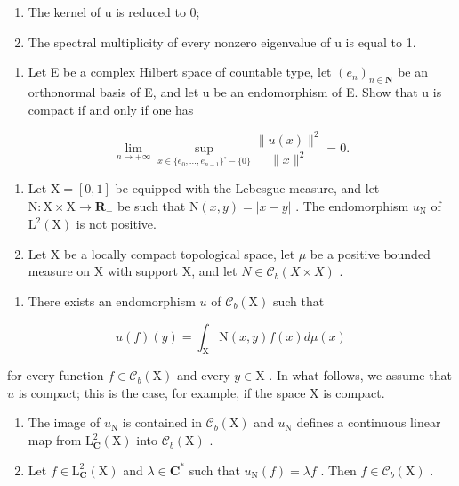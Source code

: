 \begin{enumerate}
\def\labelenumi{(\roman{enumi})}
\item
  The kernel of u is reduced to 0;
\item
  The spectral multiplicity of every nonzero eigenvalue of u is equal to 1.
\end{enumerate}

\begin{enumerate}
\def\labelenumi{\arabic{enumi})}
\setcounter{enumi}{12}
\tightlist
\item
  Let E be a complex Hilbert space of countable type, let \((e_{n})_{n\in\mathbf{N}}\) be an orthonormal basis of E, and let u be an endomorphism of E. Show that u is compact if and only if one has
\end{enumerate}

\[
\lim _ {n \to + \infty} \sup _ {x \in \{e _ {0}, \dots , e _ {n - 1} \} ^ {\circ} - \{0 \}} \frac {\| u (x) \| ^ {2}}{\| x \| ^ {2}} = 0.
\]

\begin{enumerate}
\def\labelenumi{\arabic{enumi})}
\setcounter{enumi}{13}
\item
  Let \(\mathrm{X} = [0,1]\) be equipped with the Lebesgue measure, and let \(\mathrm{N}\colon \mathrm{X}\times \mathrm{X}\to \mathbf{R}_{+}\) be such that \(\mathrm{N}(x,y) = |x - y|\) . The endomorphism \(u_{\mathrm{N}}\) of \(\mathrm{L}^2 (\mathrm{X})\) is not positive.
\item
  Let X be a locally compact topological space, let \(\mu\) be a positive bounded measure on X with support X, and let \(N \in \mathcal{C}_{b}(X \times X)\) .
\end{enumerate}

\begin{enumerate}
\def\labelenumi{\alph{enumi})}
\tightlist
\item
  There exists an endomorphism \(u\) of \(\mathcal{C}_b(\mathrm{X})\) such that
\end{enumerate}

\[
u (f) (y) = \int_ {\mathrm{X}} \mathrm{N} (x, y) f (x) d \mu (x)
\]

for every function \(f \in \mathcal{C}_b(\mathrm{X})\) and every \(y \in \mathrm{X}\) . In what follows, we assume that \(u\) is compact; this is the case, for example, if the space \(\mathrm{X}\) is compact.

\begin{enumerate}
\def\labelenumi{\alph{enumi})}
\setcounter{enumi}{1}
\item
  The image of \(u_{\mathrm{N}}\) is contained in \(\mathcal{C}_b(\mathrm{X})\) and \(u_{\mathrm{N}}\) defines a continuous linear map from \(\mathrm{L}_{\mathbf{C}}^{2}(\mathrm{X})\) into \(\mathcal{C}_b(\mathrm{X})\) .
\item
  Let \(f \in \mathrm{L}_{\mathbf{C}}^{2}(\mathrm{X})\) and \(\lambda \in \mathbf{C}^*\) such that \(u_{\mathrm{N}}(f) = \lambda f\) . Then \(f \in \mathcal{C}_b(\mathrm{X})\) .
\end{enumerate}

